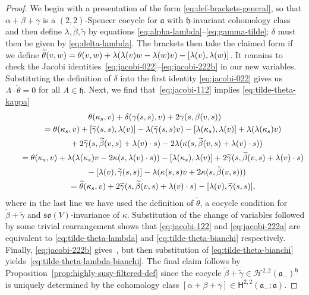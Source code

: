 \documentclass[11pt]{article}
\numberwithin{equation}{section}
\numberwithin{equation}{section}
\newcommand{\fa}{\mathfrak{a}}
\newcommand{\fh}{\mathfrak{h}}
\newcommand{\fso}{\mathfrak{so}}
\newcommand{\cH}{\mathcal{H}}
\newcommand{\ssH}{\mathsf{H}}
\newcommand{\betatilde}{\widetilde{\beta}}
\newcommand{\gammatilde}{\widetilde{\gamma}}
\newcommand{\thetatilde}{\widetilde{\theta}}
\newcommand{\1}{\mathbbm{1}}
\begin{document}
\begin{proof}
	We begin with a presentation of the form \eqref{eq:def-brackets-general}, so that $\alpha+\beta+\gamma$ is a $(2,2)$-Spencer cocycle for $\fa$ with $\fh$-invariant cohomology class and then define $\lambda,\betatilde,\gammatilde$ by equations \eqref{eq:alpha-lambda}--\eqref{eq:gamma-tilde}; $\delta$ must then be given by \eqref{eq:delta-lambda}. The brackets then take the claimed form if we define
$\thetatilde(v,w) = \theta(v,w) + \lambda(\lambda(v)w-\lambda(w)v) - \comm{\lambda(v)}{\lambda(w)}$.
	It remains to check the Jacobi identities~\eqref{eq:jacobi-022}--\eqref{eq:jacobi-222b} in our new variables. Substituting the definition of $\delta$ into the first identity \eqref{eq:jacobi-022} gives us $A\cdot \thetatilde=0$ for all $A\in\fh$. Next, we find that~\eqref{eq:jacobi-112} implies \eqref{eq:tilde-theta-kappa}
	\begin{gather*}
		\theta(\kappa_s,v) + \delta(\gamma(s,s),v) + 2\gamma(s,\beta(v,s)) \\
		\qquad= \theta(\kappa_s,v) + \comm{\gammatilde(s,s)}{\lambda(v)} - \lambda(\gammatilde(s,s)v) - \comm{\lambda(\kappa_s)}{\lambda(v)} + \lambda(\lambda(\kappa_s)v) \\
		\phantom{\qquad=}{}+ 2\gammatilde(s,\betatilde(v,s)+\lambda(v)\cdot s) - 2\lambda(\kappa(s,\betatilde(v,s)+\lambda(v)\cdot s)) \\
	\qquad	= \theta(\kappa_s,v) + \lambda\qty(\lambda(\kappa_s)v - 2\kappa(s,\lambda(v)\cdot s)) - \comm{\lambda(\kappa_s)}{\lambda(v)} + 2\gammatilde(s,\betatilde(v,s)+\lambda(v)\cdot s)\\
			\phantom{\qquad=}{}- \comm{\lambda(v)}{\gammatilde(s,s)}
			- \lambda(\kappa(s,s)v + 2\kappa(s,\betatilde(v,s)))\\
		\qquad= \thetatilde(\kappa_s,v) + 2\gammatilde(s,\betatilde(v,s)+\lambda(v)\cdot s) - \comm{\lambda(v)}{\gammatilde(s,s)},
	\end{gather*}
	where in the last line we have used the definition of $\thetatilde$, a cocycle condition for $\betatilde+\gammatilde$ and $\fso(V)$-invariance of $\kappa$. Substitution of the change of variables followed by some trivial rearrangement shows that \eqref{eq:jacobi-122} and \eqref{eq:jacobi-222a} are equivalent to \eqref{eq:tilde-theta-lambda} and \eqref{eq:tilde-theta-bianchi} respectively. Finally, \eqref{eq:jacobi-222b} gives~\smash{$\bigl(\lambda(u)\cdot\thetatilde\bigr)(v,w)
			+ \lambda\bigl(\thetatilde(u,v)w\bigr)
	+ \text{cyclic perms.}= 0$},
	but then substitution of \eqref{eq:tilde-theta-bianchi} yields~\eqref{eq:tilde-theta-lambda-bianchi}. The final claim follows by Proposition~\ref{prop:highly-susy-filtered-def} since the cocycle $\betatilde+\gammatilde\in\cH^{2,2}(\fa_-)^\fh$ is uniquely determined by the cohomology class $[\alpha+\beta+\gamma]\in\ssH^{2,2}(\fa_-;\fa)$.
\end{proof}
\end{document}
